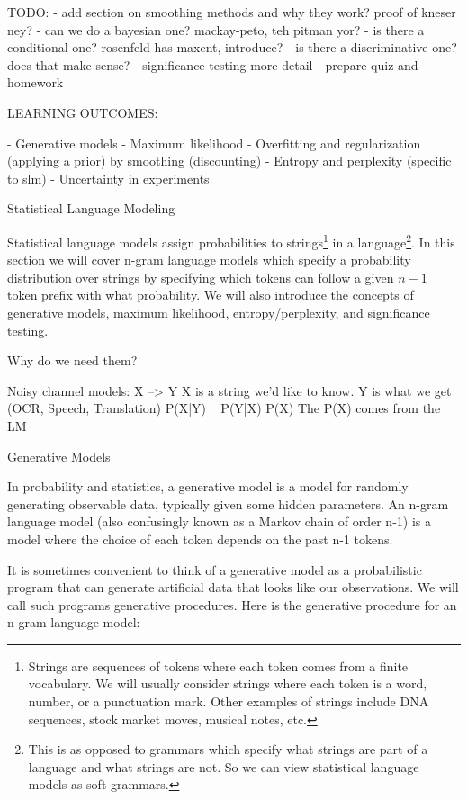 TODO:
- add section on smoothing methods and why they work?  proof of kneser ney?
- can we do a bayesian one?  mackay-peto, teh pitman yor?
- is there a conditional one?  rosenfeld has maxent, introduce?
- is there a discriminative one?  does that make sense?
- significance testing more detail
- prepare quiz and homework

LEARNING OUTCOMES:

- Generative models
- Maximum likelihood
- Overfitting and regularization (applying a prior) by smoothing (discounting)
- Entropy and perplexity (specific to slm)
- Uncertainty in experiments


Statistical Language Modeling

Statistical language models assign probabilities to
strings\footnote{Strings are sequences of tokens where each token
  comes from a finite vocabulary.  We will usually consider strings
  where each token is a word, number, or a punctuation mark.  Other
  examples of strings include DNA sequences, stock market moves,
  musical notes, etc.}  in a language\footnote{This is as opposed to
  grammars which specify what strings are part of a language and what
  strings are not.  So we can view statistical language models as soft
  grammars.}.  In this section we will cover n-gram language models
which specify a probability distribution over strings by specifying
which tokens can follow a given $n-1$ token prefix with what
probability.  We will also introduce the concepts of generative
models, maximum likelihood, entropy/perplexity, and significance
testing.

Why do we need them?

Noisy channel models: X --> Y
X is a string we'd like to know.
Y is what we get (OCR, Speech, Translation)
P(X|Y) ~ P(Y|X) P(X)
The P(X) comes from the LM


Generative Models

In probability and statistics, a generative model is a model for
randomly generating observable data, typically given some hidden
parameters.  An n-gram language model (also confusingly known as a
Markov chain of order n-1) is a model where the choice of each token
depends on the past n-1 tokens.

It is sometimes convenient to think of a generative model as a
probabilistic program that can generate artificial data that looks
like our observations.  We will call such programs generative
procedures.  Here is the generative procedure for an n-gram language
model:

